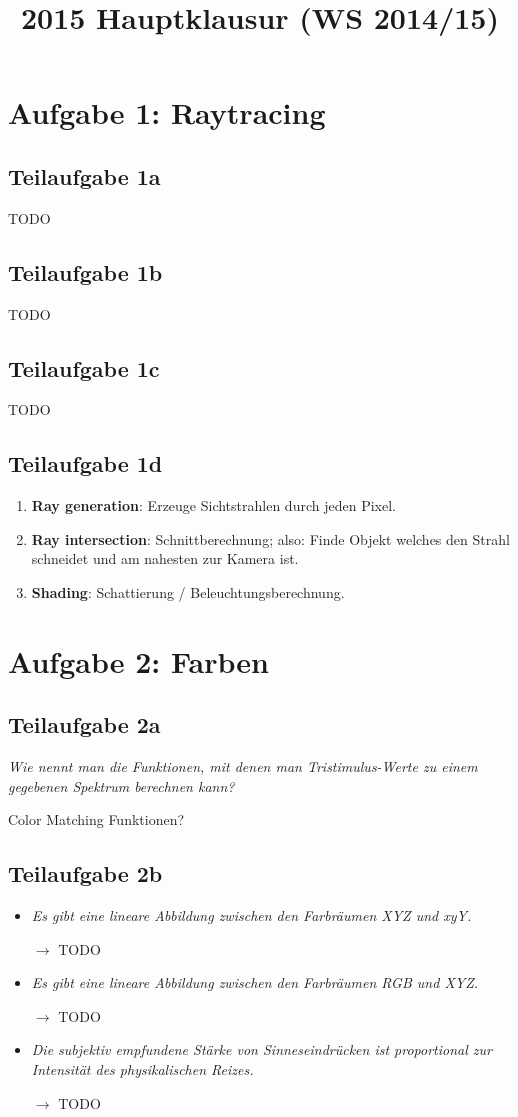\documentclass[a4paper]{scrartcl}
\begin{document}
\title{2015 Hauptklausur (WS 2014/15)}

\setcounter{section}{1}
\section*{Aufgabe 1: Raytracing}
\subsection*{Teilaufgabe 1a}
TODO
\subsection*{Teilaufgabe 1b}
TODO
\subsection*{Teilaufgabe 1c}
TODO
\subsection*{Teilaufgabe 1d}
\begin{enumerate}
    \item \textbf{Ray generation}: Erzeuge Sichtstrahlen durch jeden Pixel.
    \item \textbf{Ray intersection}: Schnittberechnung; also: Finde Objekt
          welches den Strahl schneidet und am nahesten zur Kamera ist.
    \item \textbf{Shading}: Schattierung / Beleuchtungsberechnung.
\end{enumerate}

\section*{Aufgabe 2: Farben}
\subsection*{Teilaufgabe 2a}
\textit{Wie nennt man die Funktionen, mit denen man Tristimulus-Werte zu einem gegebenen Spektrum berechnen kann?}

Color Matching Funktionen?

\subsection*{Teilaufgabe 2b}
\begin{itemize}
    \item \textit{Es gibt eine lineare Abbildung zwischen den Farbräumen XYZ und xyY.}
    \item[$\rightarrow$] TODO
    \item \textit{Es gibt eine lineare Abbildung zwischen den Farbräumen RGB und XYZ.}
    \item[$\rightarrow$] TODO
    \item \textit{Die subjektiv empfundene Stärke von Sinneseindrücken ist proportional zur Intensität des physikalischen Reizes.}
    \item[$\rightarrow$] TODO
\end{itemize}
\end{document}
